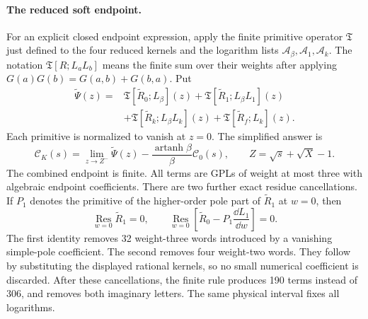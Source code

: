 \paragraph{The reduced soft endpoint.}
For an explicit closed endpoint expression, apply the finite
primitive operator $\mathfrak T$ just defined to the four reduced
kernels and the logarithm lists $\mathcal A_\beta,\mathcal A_1,\mathcal A_k$. The notation $\mathfrak T[R;L_aL_b]$ means the finite
sum over their weights after applying
$G(a)G(b)=G(a,b)+G(b,a)$.  Put
\begin{equation}
 \begin{aligned}
 \widetilde\Psi(z)={}&
 \mathfrak T[\widetilde R_0;L_\beta](z)
 +\mathfrak T[\widetilde R_1;L_\beta L_1](z)\\
 &+\mathfrak T[\widetilde R_k;L_\beta L_k](z)
 +\mathfrak T[\widetilde R_f;L_k](z).
 \end{aligned}
\end{equation}
Each primitive is normalized to vanish at $z=0$.  The simplified
answer is
\begin{equation}
 \boxed{\mathcal C_K(s)=
 \lim_{z\to Z^-}\widetilde\Psi(z)
 -\frac{\operatorname{artanh}\beta}{\beta}\mathcal C_0(s),
 \qquad Z=\sqrt s+\sqrt X-1.}
 \label{eq:comp-ck-simplified-endpoint}
\end{equation}
The combined endpoint is finite.  All terms are GPLs of weight at
most three with algebraic endpoint coefficients.  There are two further exact residue cancellations.  If
$P_1$ denotes the primitive of the higher-order pole part of
$\widetilde R_1$ at $w=0$, then
\begin{equation}
 \operatorname*{Res}_{w=0}\widetilde R_1=0,\qquad
 \operatorname*{Res}_{w=0}\left[
 \widetilde R_0-P_1\frac{\dd L_1}{\dd w}\right]=0.
\end{equation}
The first identity removes 32 weight-three words introduced by a
vanishing simple-pole coefficient.  The second removes four
weight-two words.  They follow by substituting the displayed rational
kernels, so no small numerical coefficient is discarded.
After these cancellations, the finite rule produces 190 terms instead
of 306, and removes both imaginary letters.  The same physical interval fixes all logarithms.
